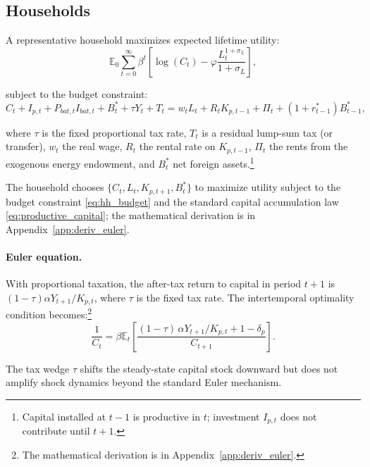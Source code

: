 	\subsection{Households} \label{sec:households}
	
	A representative household maximizes expected lifetime utility:
	\begin{equation}
		\mathbb{E}_0 \sum_{t=0}^{\infty} \beta^t
		\left[
		\log(C_t) - \varphi \frac{L_t^{1+\sigma_L}}{1+\sigma_L}
		\right]
		\label{eq:utility},
	\end{equation}
	
	subject to the budget constraint:
	\begin{equation}
		C_t + I_{p,t} + P_{bat,t} I_{bat,t} + B^*_t + \tau Y_t + T_t
		=
		w_t L_t + R_t K_{p,t-1} + \Pi_t + (1+r^*_{t-1}) B^*_{t-1}
		\label{eq:hh_budget},
	\end{equation}
	
	where $\tau$ is the fixed proportional tax rate, $T_t$ is a residual lump-sum tax (or transfer), $w_t$ the real wage, $R_t$ the rental rate on $K_{p,t-1}$, $\Pi_t$ the rents from the exogenous energy endowment, and $B^*_t$ net foreign assets.\footnote{\label{fn:timing_convention}Capital installed at $t-1$ is productive in $t$; investment $I_{p,t}$ does not contribute until $t+1$.}

The household chooses $\{C_t, L_t, K_{p,t+1}, B^*_t\}$ to maximize utility subject to the budget constraint \eqref{eq:hh_budget} and the standard capital accumulation law \eqref{eq:productive_capital}; the mathematical derivation is in Appendix~\ref{app:deriv_euler}.
	
	
\paragraph{Euler equation.} With proportional taxation, the after-tax return to capital in period $t+1$ is $(1-\tau)\alpha Y_{t+1}/K_{p,t}$, where $\tau$ is the fixed tax rate. The intertemporal optimality condition becomes:\footnote{The mathematical derivation is in Appendix~\ref{app:deriv_euler}.}
	\begin{equation}
		\frac{1}{C_t} = \beta \mathbb{E}_t \left[ \frac{(1-\tau)\,\alpha Y_{t+1}/K_{p,t} + 1 - \delta_p}{C_{t+1}} \right]
		\label{eq:euler}.
	\end{equation}
	
	The tax wedge $\tau$ shifts the steady-state capital stock downward but does not amplify shock dynamics beyond the standard Euler mechanism.
	
